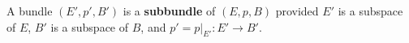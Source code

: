 A bundle $(E', p', B')$ is a \textbf{subbundle} of $(E, p, B)$ provided $E'$ is a subspace of $E$, $B'$ is a subspace of $B$, and $p' = p|_{E'}: E' \rightarrow B'$.
